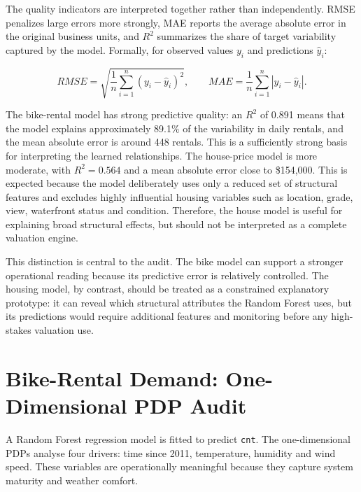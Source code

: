 \documentclass[
]{article}
\begin{document}
The quality indicators are interpreted together rather than independently. RMSE penalizes large errors more strongly, MAE reports the average absolute error in the original business units, and $R^2$ summarizes the share of target variability captured by the model. Formally, for observed values $y_i$ and predictions $\hat{y}_i$:

\[
RMSE=\sqrt{\frac{1}{n}\sum_{i=1}^{n}(y_i-\hat{y}_i)^2}, \qquad
MAE=\frac{1}{n}\sum_{i=1}^{n}|y_i-\hat{y}_i|.
\]

The bike-rental model has strong predictive quality: an $R^2$ of 0.891 means that the model explains approximately 89.1\% of the variability in daily rentals, and the mean absolute error is around 448 rentals. This is a sufficiently strong basis for interpreting the learned relationships. The house-price model is more moderate, with $R^2=0.564$ and a mean absolute error close to \$154,000. This is expected because the model deliberately uses only a reduced set of structural features and excludes highly influential housing variables such as location, grade, view, waterfront status and condition. Therefore, the house model is useful for explaining broad structural effects, but should not be interpreted as a complete valuation engine.

This distinction is central to the audit. The bike model can support a stronger operational reading because its predictive error is relatively controlled. The housing model, by contrast, should be treated as a constrained explanatory prototype: it can reveal which structural attributes the Random Forest uses, but its predictions would require additional features and monitoring before any high-stakes valuation use.

\section{Bike-Rental Demand: One-Dimensional PDP Audit}
\label{bike-rental-demand-one-dimensional-pdp-audit}

A Random Forest regression model is fitted to predict \texttt{cnt}. The one-dimensional PDPs analyse four drivers: time since 2011, temperature, humidity and wind speed. These variables are operationally meaningful because they capture system maturity and weather comfort.
\end{document}
